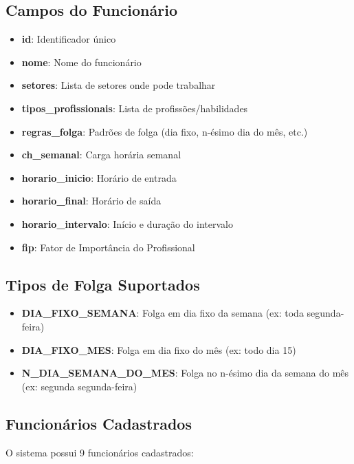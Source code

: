 \documentclass[11pt,a4paper]{article}
\begin{document}
\subsection{Campos do Funcionário}

\begin{itemize}[leftmargin=2cm]
    \item \textbf{id}: Identificador único
    \item \textbf{nome}: Nome do funcionário
    \item \textbf{setores}: Lista de setores onde pode trabalhar
    \item \textbf{tipos\_profissionais}: Lista de profissões/habilidades
    \item \textbf{regras\_folga}: Padrões de folga (dia fixo, n-ésimo dia do mês, etc.)
    \item \textbf{ch\_semanal}: Carga horária semanal
    \item \textbf{horario\_inicio}: Horário de entrada
    \item \textbf{horario\_final}: Horário de saída
    \item \textbf{horario\_intervalo}: Início e duração do intervalo
    \item \textbf{fip}: Fator de Importância do Profissional
\end{itemize}

\subsection{Tipos de Folga Suportados}

\begin{itemize}[leftmargin=2cm]
    \item \textbf{DIA\_FIXO\_SEMANA}: Folga em dia fixo da semana (ex: toda segunda-feira)
    \item \textbf{DIA\_FIXO\_MES}: Folga em dia fixo do mês (ex: todo dia 15)
    \item \textbf{N\_DIA\_SEMANA\_DO\_MES}: Folga no n-ésimo dia da semana do mês (ex: segunda segunda-feira)
\end{itemize}

\subsection{Funcionários Cadastrados}

O sistema possui 9 funcionários cadastrados:
\end{document}
